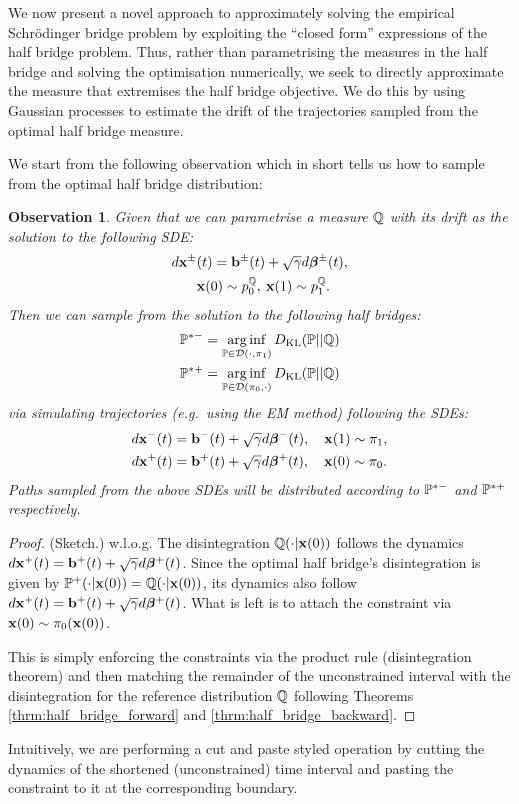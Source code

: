 \documentclass[a4paper,12pt,twoside,openright]{report}
\newtheorem{observation}{Observation}
\theoremstyle{definition}
\begin{document}
We now present a novel approach to approximately solving the empirical Schrödinger bridge problem by exploiting the ``closed form'' expressions of the half bridge problem.  Thus, rather than parametrising the measures in the half bridge and solving the optimisation numerically, we seek to directly approximate the measure that extremises the half bridge objective. We do this by using Gaussian processes \citep{williams2006gaussian} to estimate the drift of the trajectories sampled from the optimal half bridge measure.

We start from the following observation which in short tells us how to sample from the optimal half bridge distribution:
\begin{observation}
Given that we can parametrise a measure $\Q$ with its drift as the solution to the following SDE:
\begin{align*}
    d\rvx^{\pm}&(t) =  \rvb^{\pm}(t) + \sqrt{\gamma} d \rvw^{\pm}(t) ,\\
 &\rvx(0) \sim p_0^\Q,\:\rvx(1) \sim p_1^\Q.
\end{align*}
Then we can sample from the solution to the following half bridges:
\begin{align*}
   \P^{*-} = \arginf_{\P \in \calD(\cdot,\pi_1)}\KL(\P || \Q) \\ 
   \P^{*+} = \arginf_{\P \in \calD(\pi_0,\cdot )}\KL(\P || \Q)
\end{align*}
via simulating trajectories (e.g.\ using the EM method) following the SDEs:
\begin{align*}
     d\rvx^{-}(t) &=   \rvb^{-}(t) + \sqrt{\gamma} d \rvw^{-}(t) , \quad  \rvx(1) \sim \pi_1, \\
     d\rvx^{+}(t) &=  \rvb^{+}(t) + \sqrt{\gamma} d \rvw^{+}(t) , \quad  \rvx(0) \sim \pi_0.
\end{align*}
Paths sampled from the above SDEs will be distributed according to $\P^{*-}$ and $\P^{*+}$ respectively.
\end{observation}
\begin{proof}(Sketch.)
w.l.o.g. The disintegration $\Q( \cdot| \rvx(0) )$ follows the dynamics $d\rvx^{+}(t) =  \rvb^{+}(t) + \sqrt{\gamma} d \rvw^{+}(t)$. Since the optimal half bridge's disintegration is given by $\P^+( \cdot| \rvx(0) ) =\Q( \cdot| \rvx(0) )$, its dynamics also follow  $d\rvx^{+}(t) =  \rvb^{+}(t) + \sqrt{\gamma} d \rvw^{+}(t)$. What is left is to attach the constraint via $\rvx(0) \sim \pi_0(\rvx(0))$. 

This is simply enforcing the constraints via the product rule (disintegration theorem) and then matching the remainder of the unconstrained interval with the disintegration for the reference distribution $\Q$ following Theorems \ref{thrm:half_bridge_forward} and \ref{thrm:half_bridge_backward}.
\end{proof}
Intuitively, we are performing a cut and paste styled operation by cutting the dynamics of the shortened (unconstrained) time interval and pasting the constraint to it at the corresponding boundary.
\end{document}
